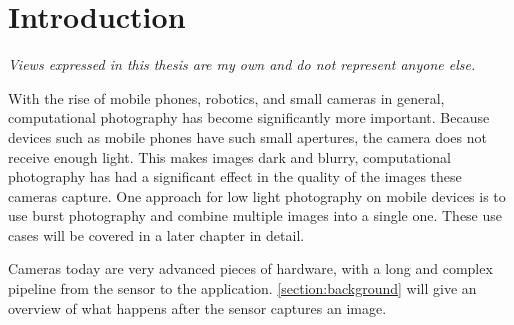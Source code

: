 \chapter{Introduction\label{intro}}
\textit{Views expressed in this thesis are my own and do not represent anyone else.}

With the rise of mobile phones, robotics, and small cameras in general,
computational photography has become significantly more important. Because
devices such as mobile phones have such small apertures, the camera does not
receive enough light. This makes images dark and blurry, computational
photography has had a significant effect in the quality of the images these
cameras capture. One approach for low light photography on mobile devices is
to use burst photography and combine multiple images into a single one. These
use cases will be covered in a later chapter in detail.

Cameras today are very advanced pieces of hardware, with a long and complex
pipeline from the sensor to the application. \cref{section:background} will
give an overview of what happens after the sensor captures an image.


